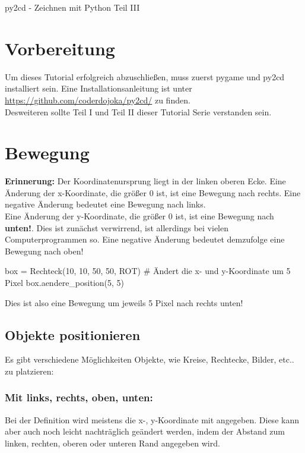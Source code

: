 \documentclass{\VorlagenPfad/coderdojokatext}
\renewcommand{\Titel}{py2cd - Zeichnen mit Python Teil III}
\begin{document}
\begin{center}
	{\huge \Titel}
\end{center}

\section{Vorbereitung}
Um dieses Tutorial erfolgreich abzuschließen, muss zuerst pygame und py2cd installiert sein. Eine Installationsanleitung ist unter \url{https://github.com/coderdojoka/py2cd/} zu finden.
\\
Desweiteren sollte Teil I und Teil II dieser Tutorial Serie verstanden sein.
\section{Bewegung}

\begin{merkbox}
\textbf{Erinnerung:} Der Koordinatenursprung  liegt in der linken oberen Ecke.
Eine Änderung der x-Koordinate, die größer 0 ist, ist eine Bewegung nach rechts. Eine negative Änderung bedeutet eine Bewegung nach links.	
\\
Eine Änderung der y-Koordinate, die größer 0 ist, ist eine Bewegung nach \textbf{unten!}. Dies ist zunächst verwirrend, ist allerdings bei vielen Computerprogrammen so. Eine negative Änderung bedeutet demzufolge eine Bewegung nach oben!	

\begin{pythoncode}
box = Rechteck(10, 10, 50, 50, ROT)
# Ändert die x- und y-Koordinate um 5 Pixel
box.aendere_position(5, 5)
\end{pythoncode}

Dies ist also eine Bewegung um jeweils 5 Pixel nach rechts unten!
\end{merkbox}

\subsection{Objekte positionieren}
Es gibt verschiedene Möglichkeiten Objekte, wie Kreise, Rechtecke, Bilder, etc.. zu platzieren:

\subsubsection{Mit links, rechts, oben, unten:}
Bei der Definition wird meistens die x-, y-Koordinate mit angegeben. Diese kann aber auch noch leicht nachträglich geändert werden, indem der Abstand zum linken, rechten, oberen oder unteren Rand angegeben wird.
\end{document}
